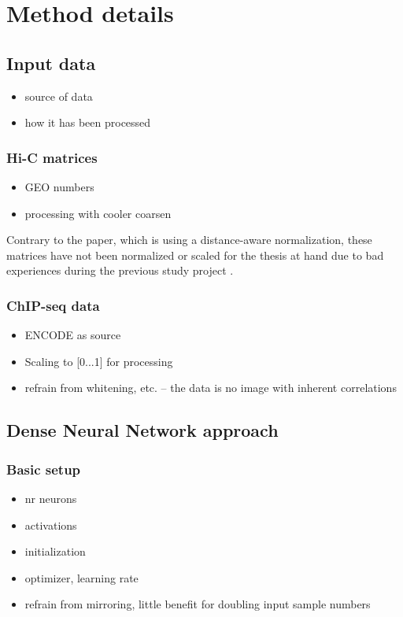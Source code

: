 \section{Method details}
\subsection{Input data}
\begin{itemize}
 \item source of data
 \item how it has been processed
\end{itemize}

\subsubsection{Hi-C matrices} \label{sec:methods:hicMatrices}
\begin{itemize}
 \item GEO numbers
 \item processing with cooler coarsen
\end{itemize}
Contrary to the paper, which is using a distance-aware normalization, 
these matrices have not been normalized or scaled for the thesis at hand
due to bad experiences during the previous study project \cite{Krauth2020}.

\subsubsection{ChIP-seq data}
\begin{itemize}
 \item ENCODE as source
 \item Scaling to [0...1] for processing
 \item refrain from whitening, etc. -- the data is no image with inherent correlations
\end{itemize}

\subsection{Dense Neural Network approach} \label{sec:methods:denseNN}
\subsubsection{Basic setup}
\begin{itemize}
 \item nr neurons
 \item activations
 \item initialization
 \item optimizer, learning rate
 \item refrain from mirroring, little benefit for doubling input sample numbers
\end{itemize}

